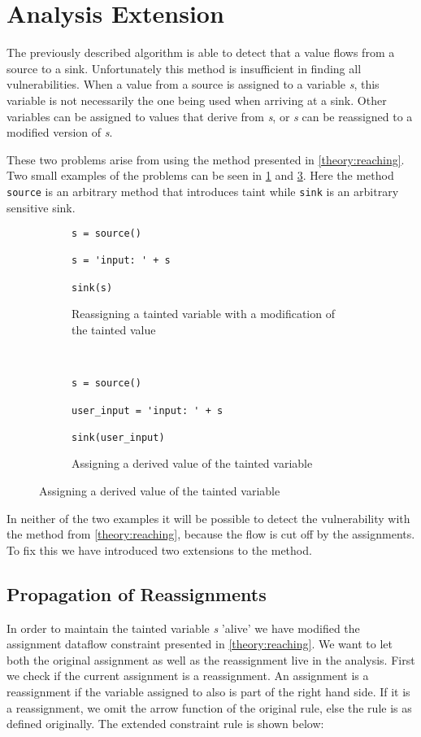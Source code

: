 \section{Analysis Extension}
The previously described algorithm is able to detect that a value flows from a source to a sink.
Unfortunately this method is insufficient in finding all vulnerabilities.
When a value from a source is assigned to a variable \textit{s}, this variable is not necessarily the one being used when arriving at a sink.
Other variables can be assigned to values that derive from \textit{s}, or \textit{s} can be reassigned to a modified version of \textit{s}.

These two problems arise from using the method presented in \cref{theory:reaching}.
Two small examples of the problems can be seen in \cref{ext:reassign} and \cref{ext:assign}.
Here the method \texttt{source} is an arbitrary method that introduces taint while \texttt{sink} is an arbitrary sensitive sink.

\begin{figure}[h]

  \begin{subfigure}[b]{0.45\textwidth}
    \begin{lstlisting}[style=python]
s = source()

s = 'input: ' + s

sink(s)
    \end{lstlisting}
    \caption{Reassigning a tainted variable with a modification of the tainted value}
    \label{ext:reassign}
  \end{subfigure}
  ~~
  \begin{subfigure}[b]{0.45\textwidth}
    \begin{lstlisting}[style=python, numbers=none]
s = source()

user_input = 'input: ' + s

sink(user_input)
    \end{lstlisting}
    \caption{Assigning a derived value of the tainted variable}
    \label{ext:assign}
  \end{subfigure}
\end{figure}

In neither of the two examples it will be possible to detect the vulnerability with the method from \cref{theory:reaching}, because the flow is cut off by the assignments.
To fix this we have introduced two extensions to the method.

\subsection{Propagation of Reassignments}
In order to maintain the tainted variable \textit{s} 'alive' we have modified the assignment dataflow constraint presented in \cref{theory:reaching}.
We want to let both the original assignment as well as the reassignment live in the analysis.
First we check if the current assignment is a reassignment.
An assignment is a reassignment if the variable assigned to also is part of the right hand side.
If it is a reassignment, we omit the arrow function of the original rule, else the rule is as defined originally.
The extended constraint rule is shown below:

